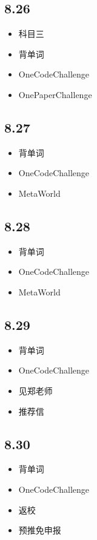 \documentclass[UTF8]{ctexart}
\begin{document}
\subsection*{8.26}
\begin{itemize}
    \item 科目三
    \item 背单词
    \item OneCodeChallenge
    \item OnePaperChallenge
\end{itemize}

\subsection*{8.27}
\begin{itemize}
    \item 背单词
    \item OneCodeChallenge
    \item MetaWorld
\end{itemize}

\subsection*{8.28}
\begin{itemize}
    \item 背单词
    \item OneCodeChallenge
    \item MetaWorld
\end{itemize}

\subsection*{8.29}
\begin{itemize}
    \item 背单词
    \item OneCodeChallenge
    \item 见郑老师
    \item 推荐信
\end{itemize}

\subsection*{8.30}
\begin{itemize}
    \item 背单词
    \item OneCodeChallenge
    \item 返校
    \item 预推免申报
\end{itemize}
\end{document}

